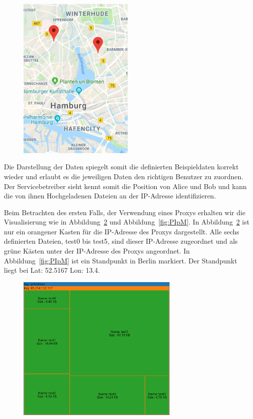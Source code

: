 \documentclass[
    fontsize=12pt,
    headings=small,
    parskip=half,           %
    bibliography=totoc,
    numbers=noenddot,       %
    open=any,               %
    ]{scrreprt}
\begin{document}
\begin{figure}[H]
\includegraphics[width=0.5\textwidth , height=0.4\textheight]{../pic/IP-Proxy-SetA.PNG}
\label{fig:ungIpM}
\end{figure}

Die Darstellung der Daten spiegelt somit die definierten Beispieldaten korrekt wieder und erlaubt es die jeweiligen Daten den richtigen Benutzer zu zuordnen. Der Servicebetreiber sieht kennt somit die Position von Alice und Bob und kann die von ihnen Hochgeladenen Dateien an der IP-Adresse identifizieren.

Beim Betrachten des ersten Falls, der Verwendung eines Proxys erhalten wir die Visualisierung wie in Abbildung~\ref{fig:PIpTM} und Abbildung~\ref{fig:PIpM}.
In Abbildung~\ref{fig:PIpTM} ist nur ein orangener Kasten für die IP-Adresse des Proxys dargestellt.
Alle sechs definierten Dateien, test0 bis test5, sind dieser IP-Adresse zugeordnet und als grüne Kästen unter der IP-Adresse des Proxys angeordnet.
In Abbildung~\ref{fig:PIpM} ist ein Standpunkt in Berlin markiert.
Der Standpunkt liegt bei Lat: 52.5167 Lon: 13.4. 

\begin{figure}[H]
\includegraphics[width=0.7\textwidth]{../pic/IP-Proxy-SetB-tree2.PNG}
\label{fig:PIpTM}
\end{figure}
\end{document}
